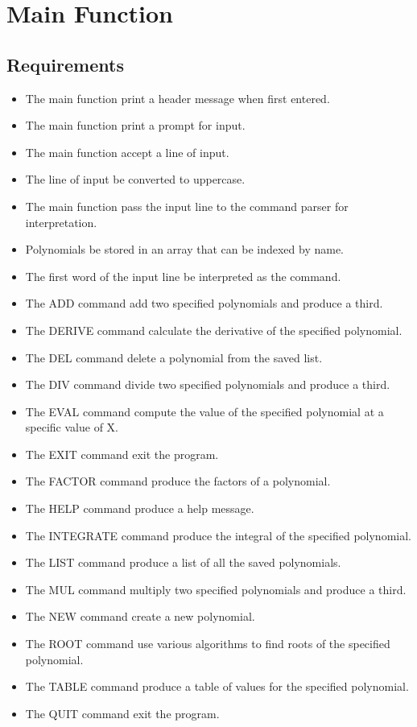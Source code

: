 \section{Main Function}
\subsection{Requirements}
\begin{itemize}
\item The main function  print a header message when first entered.
\item The main function  print a prompt for input.
\item The main function  accept a line of input.
\item The line of input  be converted to uppercase.
\item The main function  pass the input line to the command parser for interpretation.
\item Polynomials  be stored in an array that can be indexed by name.
\item The first word of the input line  be interpreted as the command.
\item The ADD command  add two specified polynomials and produce a third.
\item The DERIVE command  calculate the derivative of the specified polynomial.
\item The DEL command  delete a polynomial from the saved list.
\item The DIV command  divide two specified polynomials and produce a third.
\item  The EVAL command  compute the value of the specified polynomial at a specific value of X.
\item The EXIT command  exit the program.
\item The FACTOR command  produce the factors of a polynomial.
\item The HELP command  produce a help message.
\item The INTEGRATE command  produce the integral of the specified polynomial.
\item The LIST command  produce a list of all the saved polynomials.
\item The MUL command  multiply two specified polynomials and produce a third.
\item The NEW command  create a new polynomial.
\item The ROOT command  use various algorithms to find roots of the specified polynomial.
\item The TABLE command  produce a table of values for the specified polynomial.
\item The QUIT command  exit the program.
\end{itemize}

